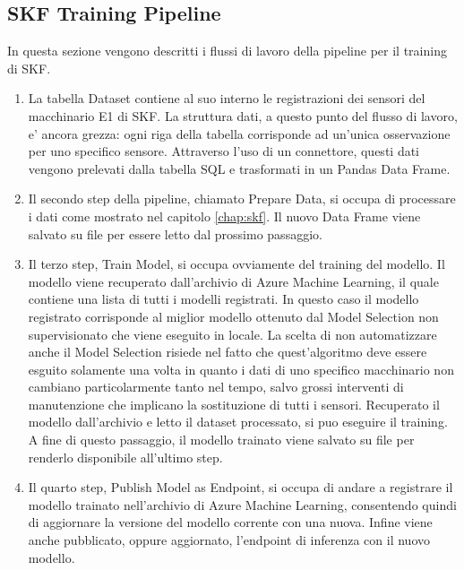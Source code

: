 \subsection{SKF Training Pipeline}
In questa sezione vengono descritti i flussi di lavoro della pipeline per il training di SKF.
\begin{enumerate}
	\item La tabella Dataset contiene al suo interno le registrazioni dei sensori del macchinario E1 di SKF. La struttura dati, a questo punto del flusso di lavoro, e' ancora grezza: ogni riga della tabella corrisponde ad un'unica osservazione per uno specifico sensore. Attraverso l'uso di un connettore, questi dati vengono prelevati dalla tabella SQL e trasformati in un Pandas Data Frame.
	\item Il secondo step della pipeline, chiamato Prepare Data, si occupa di processare i dati come mostrato nel capitolo \ref{chap:skf}. Il nuovo Data Frame viene salvato su file per essere letto dal prossimo passaggio.
	\item Il terzo step, Train Model, si occupa ovviamente del training del modello. Il modello viene recuperato dall'archivio di Azure Machine Learning, il quale contiene una lista di tutti i modelli registrati. In questo caso il modello registrato corrisponde al miglior modello ottenuto dal Model Selection non supervisionato che viene eseguito in locale. La scelta di non automatizzare anche il Model Selection risiede nel fatto che quest'algoritmo deve essere esguito solamente una volta in quanto i dati di uno specifico macchinario non cambiano particolarmente tanto nel tempo, salvo grossi interventi di manutenzione che implicano la sostituzione di tutti i sensori. Recuperato il modello dall'archivio e letto il dataset processato, si puo eseguire il training. A fine di questo passaggio, il modello trainato viene salvato su file per renderlo disponibile all'ultimo step.
	\item Il quarto step, Publish Model as Endpoint, si occupa di andare a registrare il modello trainato nell'archivio di Azure Machine Learning, consentendo quindi di aggiornare la versione del modello corrente con una nuova. Infine viene anche pubblicato, oppure aggiornato, l'endpoint di inferenza con il nuovo modello.
\end{enumerate}


